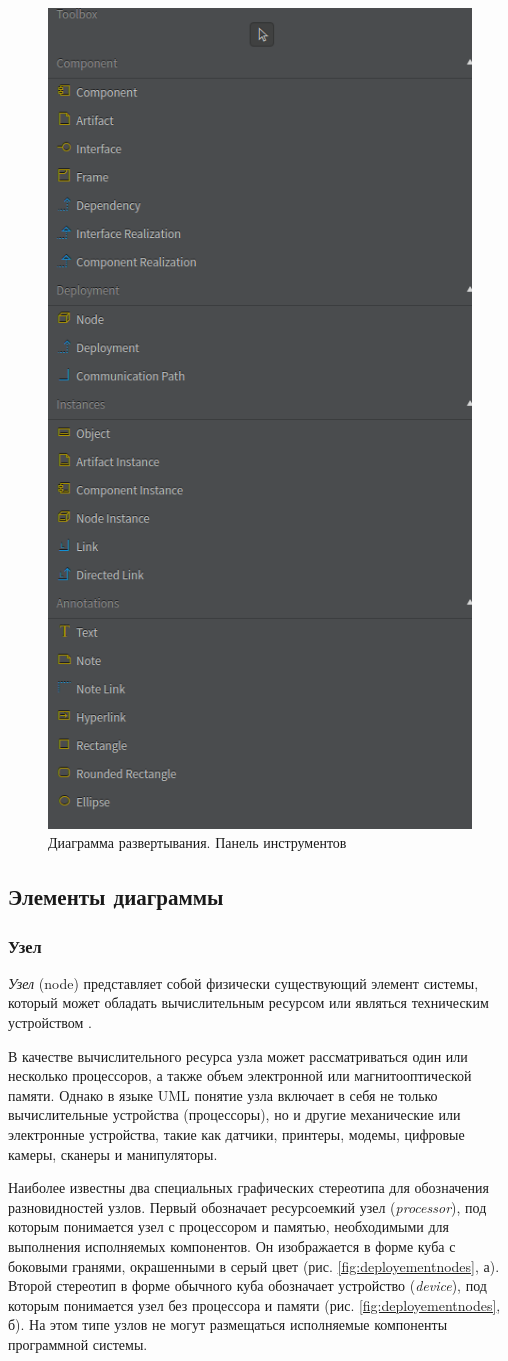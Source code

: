\documentclass[a4paper,12pt]{report}
\begin{document}
\begin{figure}[h!]
	\centering
	\includegraphics[width=0.3\linewidth]{images/toolboxdeployement}
	\caption{Диаграмма развертывания. Панель инструментов}
	\label{fig:toolboxdeployement}
\end{figure}


\subsection*{Элементы диаграммы}
\subsubsection*{Узел}
\textit{Узел} (node) представляет собой физически существующий элемент системы, который может обладать вычислительным ресурсом или являться техническим устройством .

В качестве вычислительного ресурса узла может рассматриваться один или несколько процессоров, а также объем электронной или магнитооптической памяти. Однако в языке UML понятие узла включает в себя не только вычислительные устройства (процессоры), но и другие механические или электронные устройства, такие как датчики, принтеры, модемы, цифровые камеры, сканеры и манипуляторы.

Наиболее известны два специальных графических стереотипа для обозначения разновидностей узлов. Первый обозначает ресурсоемкий узел (\textit{processor}), под которым понимается узел с процессором и памятью, необходимыми для выполнения исполняемых компонентов. Он изображается в форме куба с боковыми гранями, окрашенными в серый цвет (рис. \ref{fig:deployementnodes}, а). Второй стереотип в форме обычного куба обозначает устройство (\textit{device}), под которым понимается узел без процессора и памяти (рис. \ref{fig:deployementnodes}, б). На этом типе узлов не могут размещаться исполняемые компоненты программной системы.
\end{document}
